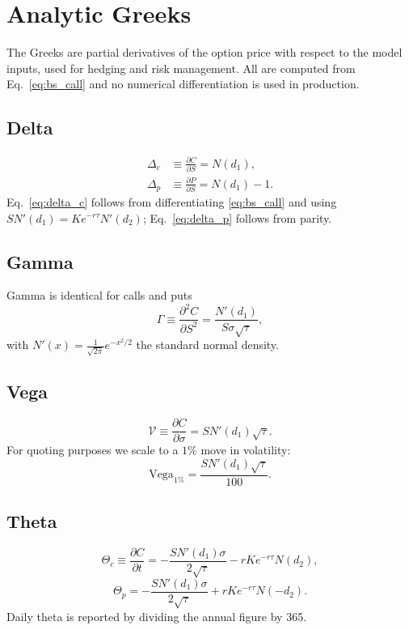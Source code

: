 \documentclass[twocolumn,10pt]{article}
\begin{document}
\section{Analytic Greeks}
\label{sec:greeks}

The Greeks are partial derivatives of the option price with respect to the model inputs, used for hedging and risk management. All are computed from Eq.~\eqref{eq:bs_call} and no numerical differentiation is used in production.

\subsection{Delta}
\begin{align}
    \Delta_c &\equiv \frac{\partial C}{\partial S} = N(d_1), \label{eq:delta_c}\\
    \Delta_p &\equiv \frac{\partial P}{\partial S} = N(d_1) - 1. \label{eq:delta_p}
\end{align}
Eq.~\eqref{eq:delta_c} follows from differentiating \eqref{eq:bs_call} and using $S N'(d_1) = K e^{-r\tau} N'(d_2)$; Eq.~\eqref{eq:delta_p} follows from parity.

\subsection{Gamma}
Gamma is identical for calls and puts
\begin{equation}
    \Gamma \equiv \frac{\partial^2 C}{\partial S^2} = \frac{N'(d_1)}{S \sigma \sqrt{\tau}},
    \label{eq:gamma}
\end{equation}
with $N'(x) = \frac{1}{\sqrt{2\pi}} e^{-x^2/2}$ the standard normal density.

\subsection{Vega}
\begin{equation}
    \mathcal{V} \equiv \frac{\partial C}{\partial \sigma} = S N'(d_1) \sqrt{\tau}.
    \label{eq:vega_raw}
\end{equation}
For quoting purposes we scale to a $1\%$ move in volatility:
\begin{equation}
    \text{Vega}_{1\%} = \frac{S N'(d_1) \sqrt{\tau}}{100}.
    \label{eq:vega}
\end{equation}

\subsection{Theta}
\begin{equation}
    \Theta_c \equiv \frac{\partial C}{\partial t}
    = -\frac{S N'(d_1) \sigma}{2\sqrt{\tau}} - r K e^{-r\tau} N(d_2),
    \label{eq:theta_c}
\end{equation}
\begin{equation}
    \Theta_p = -\frac{S N'(d_1) \sigma}{2\sqrt{\tau}} + r K e^{-r\tau} N(-d_2).
    \label{eq:theta_p}
\end{equation}
Daily theta is reported by dividing the annual figure by 365.
\end{document}

